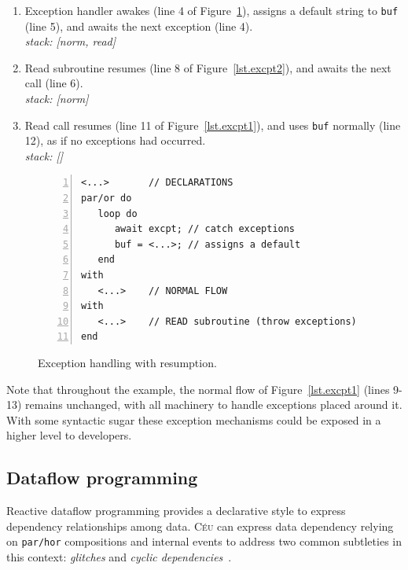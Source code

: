 \documentclass{acm_proc_article-sp}
\newcommand{\CEU}{\textsc{C\'{e}u}\xspace}
\newcommand{\code}[1] {{\small{\texttt{#1}}}}
\newcommand{\1}{\;}
\newcommand{\2}{\;\;}
\newcommand{\3}{\;\;\;}
\newcommand{\5}{\;\;\;\;\;}
\begin{document}
{\small
\begin{enumerate}[start=3]
\setlength{\itemsep}{0pt}
\item Exception handler awakes (line 4 of Figure~\ref{lst.excpt4}), assigns a 
default string to \code{buf} (line 5), and awaits the next exception (line 4).  \\
    \emph{stack: [norm, read]}
\item Read subroutine resumes (line 8 of Figure~\ref{lst.excpt2}), and awaits 
the next call (line 6). \\
    \emph{stack: [norm]}
\item Read call resumes (line 11 of Figure~\ref{lst.excpt1}), and uses 
\code{buf} normally (line 12), as if no exceptions had occurred. \\
    \emph{stack: []}
\end{enumerate}
}

\begin{figure}[t]
\begin{lstlisting}[numbers=left,xleftmargin=2em]
<...>       // DECLARATIONS
par/or do
   loop do
      await excpt; // catch exceptions
      buf = <...>; // assigns a default
   end
with
   <...>    // NORMAL FLOW
with
   <...>    // READ subroutine (throw exceptions)
end
\end{lstlisting}
\caption{ Exception handling with resumption.
\label{lst.excpt4}
}
\end{figure}

Note that throughout the example, the normal flow of Figure~\ref{lst.excpt1} 
(lines 9-13) remains unchanged, with all machinery to handle exceptions placed 
around it.
With some syntactic sugar these exception mechanisms could be exposed in a 
higher level to developers.

\subsection{Dataflow programming}
\label{sec.adv.frp}

Reactive dataflow programming provides a declarative style to express 
dependency relationships among data.
%
\CEU can express data dependency relying on \code{par/hor} compositions and 
internal events to address two common subtleties in this context: 
\emph{glitches} and \emph{cyclic dependencies}~\cite{frp.survey}.
\end{document}
